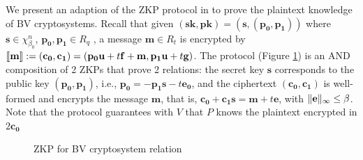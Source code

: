 We present an adaption of the ZKP protocol in \cite{benhamouda2014better} to
prove the plaintext knowledge of BV cryptosystems. Recall that given
$\mathbf{(sk,pk) = (s,(p_0,p_1))}$ where $\mathbf{s} \in \chi_{\beta_0}^n$,
$\mathbf{p_0,p_1} \in R_q$ , a message $\mathbf{m} \in R_t$ is encrypted by
$\left\llbracket\mathbf{m}\right\rrbracket := \mathbf{(c_0, c_1)} = (\mathbf{p_0u} + t\mathbf{f + m,
  p_1u} + t\mathbf{g)}$. The protocol (Figure \ref{fig:belhamoudaProtocol}) is
an AND composition of 2 ZKPs that prove 2 relations: the secret key $\mathbf{s}$
corresponds to the public key $\mathbf{(p_0,p_1)}$, i.e.,
$\mathbf{p_0 = -p_1s} - t\mathbf{e_0}$, and the ciphertext $\mathbf{(c_0,c_1)}$
is well-formed and encrypts the message $\mathbf{m}$, that is,
$\mathbf{c_0 + c_1s} = \mathbf{m} + t\mathbf{e}$, with
$\Vert \mathbf{e} \Vert_{\infty} \leq \beta$. Note that the protocol guarantees with $V$
that $P$ knows the plaintext encrypted in $2\mathbf{c_0}$

\begin{figure}[htbp!] 
  \centering {}
  \caption{ZKP for BV cryptosystem relation}
  \label{fig:belhamoudaProtocol}
\end{figure}

